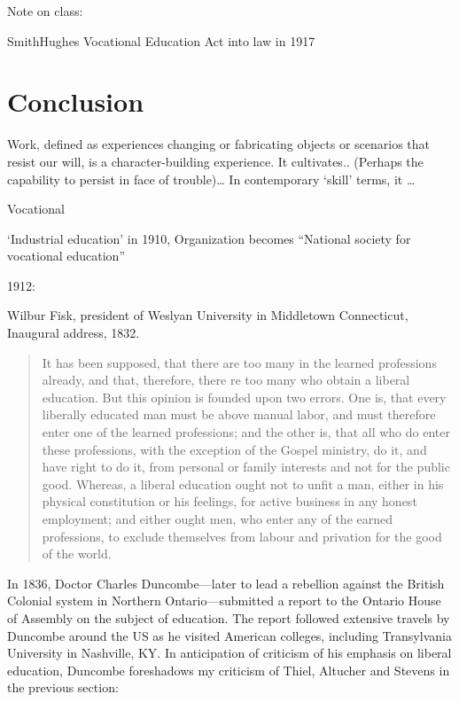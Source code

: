 Note on class:

SmithHughes Vocational Education Act into law in 1917

\section{Conclusion}
\label{conclusion}

Work, defined as experiences changing or fabricating objects or scenarios that resist our will, is a character-building experience. It cultivates.. (Perhaps the capability to persist in face of trouble){\ldots} In contemporary `skill' terms, it {\ldots}

Vocational

`Industrial education' in 1910, Organization becomes ``National society for vocational education''

1912: ~\citep{Page:1912we}

Wilbur Fisk, president of Weslyan University in Middletown Connecticut, Inaugural address, 1832. 

\begin{quote}

It has been supposed, that there are too many in the learned professions already, and that, therefore, there re too many who obtain a liberal education. But this opinion is founded upon two errors. One is, that every liberally educated man must be above manual labor, and must therefore enter one of the learned professions; and the other is, that all who do enter these professions, with the exception of the Gospel ministry, do it, and have right to do it, from personal or family interests and not for the public good. Whereas, a liberal education ought not to unfit a man, either in his physical constitution or his feelings, for active business in any honest employment; and either ought men, who enter any of the earned professions, to exclude themselves from labour and privation for the good of the world. ~\citep[P. 7]{Fisk:1832vk}
\end{quote}

In 1836, Doctor Charles Duncombe---later to lead a rebellion against the British Colonial system in Northern Ontario---submitted a report to the Ontario House of Assembly on the subject of education. The report followed extensive travels by Duncombe around the US as he visited American colleges, including Transylvania University in Nashville, KY. In anticipation of criticism of his emphasis on liberal education, Duncombe foreshadows my criticism of Thiel, Altucher and Stevens in the previous section:

